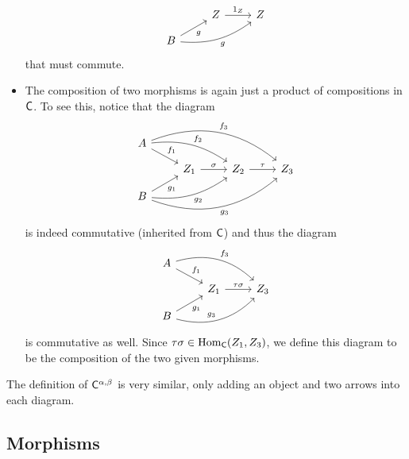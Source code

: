 \begin{solution}
\begin{itemize}
\begin{equation*}
\begin{tikzcd}[row sep=small]
					& Z \arrow[r, "1_Z"]& Z \\
					B \arrow[ur, "g" swap] \arrow[urr, bend right=20,"g"'] & &
				\end{tikzcd}
			\end{equation*}
			that must commute.
		\item The composition of two morphisms is again just a product of compositions in $\mathsf{C}$. To see this, notice that the diagram
			\begin{equation*}
				\begin{tikzcd}[row sep=small]
					A \arrow[dr, "f_1"] 
					  \arrow[drr, bend left=20,"f_2"]
					  \arrow[drrr, bend left, "f_3"] & & & \\
					& Z_1 \arrow[r, "\sigma"]& Z_2 \arrow[r, "\tau"] & Z_3 \\
					B \arrow[ur, "g_1" swap]
					  \arrow[urr, bend right=20, "g_2"']
					  \arrow[urrr, bend right, "g_3"'] & & &
				\end{tikzcd}
			\end{equation*}
			is indeed commutative (inherited from $\mathsf{C}$) and thus the diagram
			\begin{equation*}
				\begin{tikzcd}[row sep=small]
					A \arrow[dr, "f_1"] \arrow[drr, bend left,"f_3"] & & \\
					& Z_1 \arrow[r, "\tau\sigma"]& Z_3 \\
					B \arrow[ur, "g_1" swap] \arrow[urr, bend right, "g_3"] & &
				\end{tikzcd}
			\end{equation*}
			is commutative as well. Since $\tau\sigma \in \mathrm{Hom}_{\mathsf{C}}(Z_1, Z_3)$, we define this diagram to be the composition of the two given morphisms.
	\end{itemize}
	
	The definition of $\mathsf{C}^{\alpha, \beta}$ is very similar, only adding an object and two arrows into each diagram.
\end{solution}

\subsection{Morphisms}

\begin{problem}
\end{problem}

